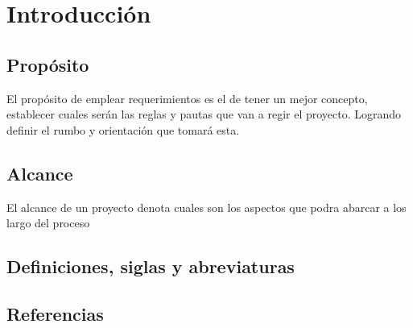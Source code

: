 \chapter{Introducción}

\section{Propósito}
El propósito de emplear requerimientos es el de tener un mejor concepto, establecer cuales serán las reglas y pautas que van a regir el proyecto. Logrando definir el rumbo y orientación que tomará esta.
\section{Alcance}
El alcance de un proyecto denota cuales son los aspectos que podra abarcar a los largo del proceso
\section{Definiciones, siglas y abreviaturas}

\section{Referencias}

